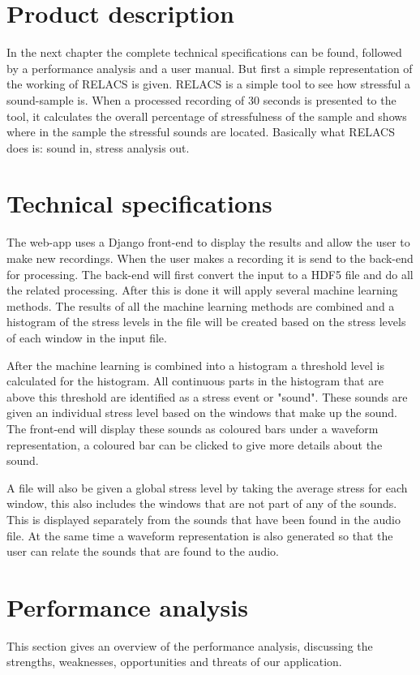 \documentclass[a4paper]{article}
\begin{document}
\section{Product description}
In the next chapter the complete technical specifications can be found, followed by a performance analysis and a user manual. 
But first a simple representation of the working of RELACS is given. RELACS is a simple tool to see how stressful a sound-sample is. 
When a processed recording of 30 seconds is presented to the tool, it calculates the overall percentage of stressfulness of the sample and shows where in the sample the stressful sounds are located. 
Basically what RELACS does is: sound in, stress analysis out.


\section{Technical specifications}
The web-app uses a Django front-end to display the results and allow the user
to make new recordings. When the user makes a recording it is send to the
back-end for processing. The back-end will first convert the input to a HDF5
file and do all the related processing. After this is done it will apply several
machine learning methods. The results of all the machine learning methods are
combined and a histogram of the stress levels in the file will be created based
on the stress levels of each window in the input file.

After the machine learning is combined into a histogram a threshold level is
calculated for the histogram. All continuous parts in the histogram that are
above this threshold are identified as a stress event or "sound". These sounds
are given an individual stress level based on the windows that make up the
sound. The front-end will display these sounds as coloured bars under a waveform
representation, a coloured bar can be clicked to give more details about the
sound.

A file will also be given a global stress level by taking the average stress
for each window, this also includes the windows that are not part of any of the
sounds. This is displayed separately from the sounds that have been found in
the audio file. At the same time a waveform representation is also generated so
that the user can relate the sounds that are found to the audio.

\section{Performance analysis}
This section gives an overview of the performance analysis, discussing the strengths, weaknesses, opportunities and threats of our application.
\end{document}
